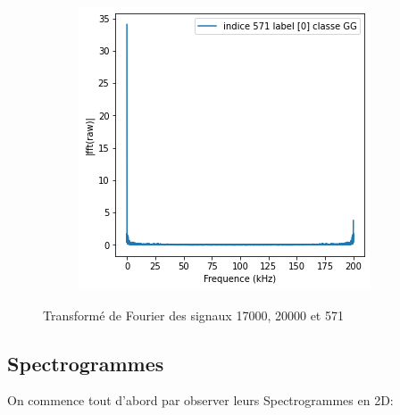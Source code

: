 \begin{figure}[!h]
\begin{subfigure}[b]{0.3\textwidth}
  \end{subfigure}
  \begin{subfigure}[b]{0.3\textwidth}
    \includegraphics[width=\textwidth]{./images/571fft.png}
  \end{subfigure}
\caption{Transformé de Fourier des signaux 17000, 20000 et 571}
\end{figure}

\hypertarget{Spectrogrammes}{%
\subsection{Spectrogrammes}
\label{Spectrogrammes}}

On commence tout d'abord par observer leurs Spectrogrammes en 2D:

